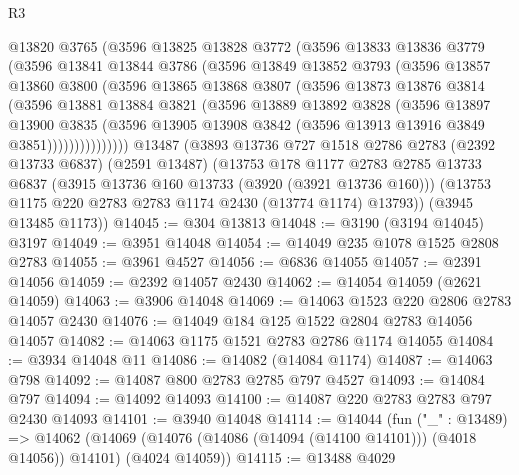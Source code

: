\begin{lexlean}{R3}
\begin{coremodule}
          @13820
          @3765
          (@3596
            @13825
            @13828
            @3772
            (@3596
              @13833
              @13836
              @3779
              (@3596
                @13841
                @13844
                @3786
                (@3596
                  @13849
                  @13852
                  @3793
                  (@3596
                    @13857
                    @13860
                    @3800
                    (@3596
                      @13865
                      @13868
                      @3807
                      (@3596
                        @13873
                        @13876
                        @3814
                        (@3596
                          @13881
                          @13884
                          @3821
                          (@3596
                            @13889
                            @13892
                            @3828
                            (@3596
                              @13897
                              @13900
                              @3835
                              (@3596
                                @13905
                                @13908
                                @3842
                                (@3596 @13913 @13916 @3849 @3851)))))))))))))))
    @13487
    (@3893
      @13736
      @727
      @1518
      @2786
      @2783
      (@2392 @13733 @6837)
      (@2591 @13487)
      (@13753
        @178
        @1177
        @2783
        @2785
        @13733
        @6837
        (@3915 @13736 @160 @13733 (@3920 (@3921 @13736 @160)))
        (@13753 @1175 @220 @2783 @2783 @1174 @2430 (@13774 @1174) @13793))
      (@3945 @13485 @1173))
@14045 := @304 @13813
@14048 := @3190 (@3194 @14045) @3197
@14049 := @3951 @14048
@14054 := @14049 @235 @1078 @1525 @2808 @2783
@14055 := @3961 @4527
@14056 := @6836 @14055
@14057 := @2391 @14056
@14059 := @2392 @14057 @2430
@14062 := @14054 @14059 (@2621 @14059)
@14063 := @3906 @14048
@14069 := @14063 @1523 @220 @2806 @2783 @14057 @2430
@14076 := @14049 @184 @125 @1522 @2804 @2783 @14056 @14057
@14082 := @14063 @1175 @1521 @2783 @2786 @1174 @14055
@14084 := @3934 @14048 @11
@14086 := @14082 (@14084 @1174)
@14087 := @14063 @798
@14092 := @14087 @800 @2783 @2785 @797 @4527
@14093 := @14084 @797
@14094 := @14092 @14093
@14100 := @14087 @220 @2783 @2783 @797 @2430 @14093
@14101 := @3940 @14048
@14114 := @14044
    (fun ("_" : @13489) =>
    @14062 (@14069 (@14076 (@14086 (@14094 (@14100 @14101))) (@4018 @14056)) @14101) (@4024 @14059))
@14115 := @13488 @4029

\end{coremodule}
\end{lexlean}
